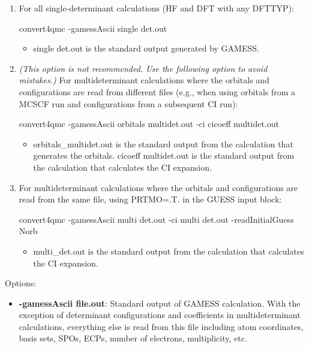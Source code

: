{\begin{enumerate}
  \item{For all single-determinant calculations (HF and DFT with any DFTTYP):}
  \begin{shade}
convert4qmc -gamessAscii single det.out
  \end{shade}
  \begin{itemize}
    \item{single det.out is the standard output generated by GAMESS.}
  \end{itemize}
  \item{\textit{(This option is not recommended. Use the following option to avoid mistakes.)} For 
    multideterminant calculations where the orbitals and configurations are read from different
    files (e.g., when using orbitals from a MCSCF run and configurations from a
    subsequent CI run):}
  \begin{shade}
convert4qmc -gamessAscii orbitals multidet.out -ci cicoeff multidet.out
  \end{shade}
  \begin{itemize}
    \item{orbitals\_multidet.out is the standard output from the calculation that generates the
       orbitals. cicoeff multidet.out is the standard output from the calculation that calculates 
       the CI expansion.}
  \end{itemize}
  \item{For multideterminant calculations where the orbitals and configurations are read from
    the same file, using PRTMO=.T. in the GUESS input block:}
  \begin{shade}
convert4qmc -gamessAscii multi det.out -ci multi det.out -readInitialGuess Norb
  \end{shade}
  \begin{itemize}
    \item{multi\_det.out is the standard output from the calculation that calculates the CI expansion.}
  \end{itemize}
\end{enumerate}

Options:
\begin{itemize}
\item{\textbf{-gamessAscii file.out}: Standard output of GAMESS calculation. With the exception 
of determinant configurations and coefficients in multideterminant calculations,
everything else is read from this file including atom coordinates, basis sets, SPOs, ECPs, number of electrons, multiplicity, etc.}


\end{itemize}}
